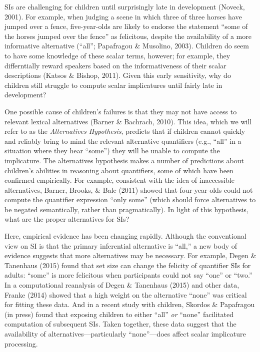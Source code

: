 \documentclass[10pt, letterpaper]{article}
\begin{document}
SIs are challenging for children until surprisingly late in development
(Noveck, 2001). For example, when judging a scene in which three of
three horses have jumped over a fence, five-year-olds are likely to
endorse the statement ``some of the horses jumped over the fence'' as
felicitous, despite the availability of a more informative alternative
(``all''; Papafragou \& Musolino, 2003). Children do seem to have some
knowledge of these scalar terms, however; for example, they
differntially reward speakers based on the informativeness of their
scalar descriptions (Katsos \& Bishop, 2011). Given this early
sensitivity, why do children still struggle to compute scalar
implicatures until fairly late in development?

One possible cause of children's failures is that they may not have
access to relevant lexical alternatives (Barner \& Bachrach, 2010). This
idea, which we will refer to as the \emph{Alternatives Hypothesis},
predicts that if children cannot quickly and reliably bring to mind the
relevant alternative quantifiers (e.g., ``all'' in a situation where
they hear ``some'') they will be unable to compute the implicature. The
alternatives hypothesis makes a number of predictions about children's
abilities in reasoning about quantifiers, some of which have been
confirmed empirically. For example, consistent with the idea of
inaccessible alternatives, Barner, Brooks, \& Bale (2011) showed that
four-year-olds could not compute the quantifier expression ``only some''
(which should force alternatives to be negated semantically, rather than
pragmatically). In light of this hypothesis, what are the proper
alternatives for SIs?

Here, empirical evidence has been changing rapidly. Although the
conventional view on SI is that the primary inferential alternative is
``all,'' a new body of evidence suggests that more alternatives may be
necessary. For example, Degen \& Tanenhaus (2015) found that set size
can change the felicity of quantifier SIs for adults: ``some'' is more
felicitous when participants could not say ``one'' or ``two.'' In a
computational reanalysis of Degen \& Tanenhaus (2015) and other data,
Franke (2014) showed that a high weight on the alternative ``none'' was
critical for fitting these data. And in a recent study with children,
Skordos \& Papafragou (in press) found that exposing children to either
``all'' \emph{or} ``none'' facilitated computation of subsequent SIs.
Taken together, these data suggest that the availability of
alternatives---particularly ``none''---does affect scalar implicature
processing.
\end{document}

